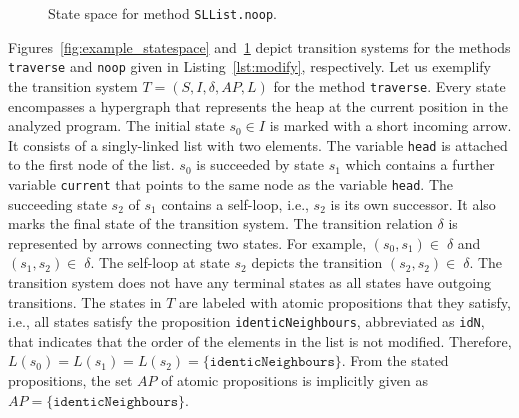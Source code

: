 \documentclass[a4paper, 12pt, twoside]{report}
\begin{document}
\begin{figure}
\begin{center}
{}
			\caption{State space for method \texttt{SLList.noop}.}\label{fig:example_statespace_noop}
		\end{center}
	\end{figure}

	Figures~\ref{fig:example_statespace} and~\ref{fig:example_statespace_noop} depict transition systems for the methods \texttt{traverse} and \texttt{noop} given in Listing~\ref{lst:modify}, respectively. Let us exemplify the transition system $T=(S, I, \delta, AP, L)$ for the method \texttt{traverse}. Every state encompasses a hypergraph that represents the heap at the current position in the analyzed program. The initial state $s_0 \in I$ is marked with a short incoming arrow. It consists of a singly-linked list with two elements. The variable \texttt{head} is attached to the first node of the list. $s_0$ is succeeded by state $s_1$ which contains a further variable \texttt{current} that points to the same node as the variable \texttt{head}. The succeeding state $s_2$ of $s_1$ contains a self-loop, i.e., $s_2$ is its own successor. It also marks the final state of the transition system. The transition relation $\delta$ is represented by arrows connecting two states. For example, $(s_0, s_1) \in\; \delta$ and $(s_1, s_2) \in\; \delta$. The self-loop at state $s_2$ depicts the transition $(s_2,s_2) \in\; \delta$. The transition system does not have any terminal states as  all states have outgoing transitions. The states in $T$ are labeled with atomic propositions that they satisfy, i.e., all states satisfy the proposition \texttt{identicNeighbours}, abbreviated as \texttt{idN}, that indicates that the order of the elements in the list is not modified. Therefore, $L(s_0)=L(s_1)=L(s_2)=\{\texttt{identicNeighbours}\}$. From the stated propositions, the set $AP$ of atomic propositions is implicitly given as $AP=\{\texttt{identicNeighbours}\}$.\\
	
\end{document}
